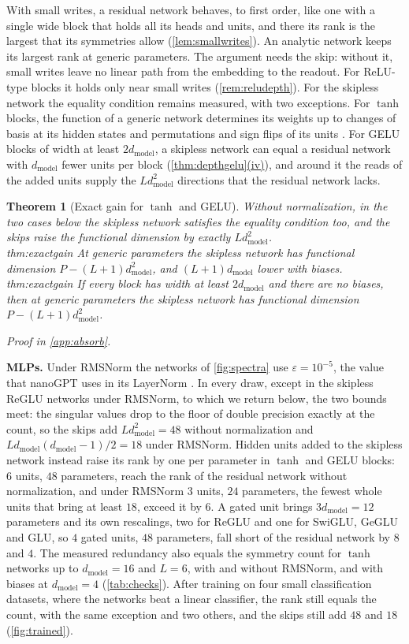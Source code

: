 \documentclass[10pt]{article}
\newtheorem{theorem}{Theorem}[section]
\theoremstyle{definition}
\theoremstyle{remark}
\newcommand{\dm}{d_{\mathrm{model}}}
\newcommand{\para}[1]{\smallskip\noindent\textbf{#1}\hspace{0.5em}}
\newcommand{\ptlabel}[1]{\phantomsection\label{#1}}
\DeclareRobustCommand{\cpref}[2]{\hyperref[#1:#2]{\cref*{#1}(#2)}}
\newcommand{\proofin}[1]{\par\vspace{-0.4\baselineskip}\noindent\hfill{\small\itshape Proof in \cref{#1}.}\par\smallskip}
\newcommand{\stpart}[3]{\ifx\relax#1\relax\else\ptlabel{#1:#2}\fi{\upshape\bfseries\boldmath(#2)\ifx\relax#3\relax\else\ #3.\fi}}
\begin{document}
With small writes, a residual network behaves, to first order, like one with a single wide block that holds all its heads and units, and there its rank is the largest that its symmetries allow (\cref{lem:smallwrites}). An analytic network keeps its largest rank at generic parameters. The argument needs the skip: without it, small writes leave no linear path from the embedding to the readout. For ReLU-type blocks it holds only near small writes (\cref{rem:reludepth}). For the skipless network the equality condition remains measured, with two exceptions. For $\tanh$ blocks, the function of a generic network determines its weights up to changes of basis at its hidden states and permutations and sign flips of its units \citep{fefferman1994}. For GELU blocks of width at least $2\dm$, a skipless network can equal a residual network with $\dm$ fewer units per block (\cpref{thm:depthgelu}{iv}), and around it the reads of the added units supply the $L\dm^2$ directions that the residual network lacks.

\begin{theorem}[Exact gain for $\tanh$ and GELU]\label{thm:exactgain}
Without normalization, in the two cases below the skipless network satisfies the equality condition too, and the skips raise the functional dimension by exactly $L\dm^2$.\\
\stpart{thm:exactgain}{i}{$\tanh$ blocks} At generic parameters the skipless network has functional dimension $P - (L+1)\dm^2$, and $(L+1)\dm$ lower with biases.\\
\stpart{thm:exactgain}{ii}{GELU blocks} If every block has width at least $2\dm$ and there are no biases, then at generic parameters the skipless network has functional dimension $P - (L+1)\dm^2$.
\end{theorem}
\proofin{app:absorb}


\para{MLPs.} Under RMSNorm the networks of \cref{fig:spectra} use $\varepsilon = 10^{-5}$, the value that nanoGPT uses in its LayerNorm \citep{karpathy2023nanogpt}. In every draw, except in the skipless ReGLU networks under RMSNorm, to which we return below, the two bounds meet: the singular values drop to the floor of double precision exactly at the count, so the skips add $L\dm^2 = 48$ without normalization and $L\dm(\dm-1)/2 = 18$ under RMSNorm. Hidden units added to the skipless network instead raise its rank by one per parameter in $\tanh$ and GELU blocks: $6$ units, $48$ parameters, reach the rank of the residual network without normalization, and under RMSNorm $3$ units, $24$ parameters, the fewest whole units that bring at least $18$, exceed it by $6$. A gated unit brings $3\dm = 12$ parameters and its own rescalings, two for ReGLU and one for SwiGLU, GeGLU and GLU, so $4$ gated units, $48$ parameters, fall short of the residual network by $8$ and $4$. The measured redundancy also equals the symmetry count for $\tanh$ networks up to $\dm = 16$ and $L = 6$, with and without RMSNorm, and with biases at $\dm = 4$ (\cref{tab:checks}). After training on four small classification datasets, where the networks beat a linear classifier, the rank still equals the count, with the same exception and two others, and the skips still add $48$ and $18$ (\cref{fig:trained}).
\end{document}
